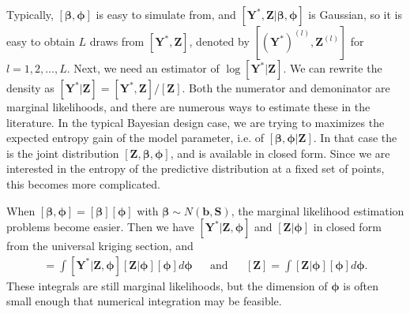 \documentclass[12pt]{article}
\begin{document}
Typically, $[\bm{\beta},\bm{\phi}]$ is easy to simulate from, and $[\bm{Y}^*,\bm{Z}|\bm{\beta},\bm{\phi}]$ is Gaussian, so it is easy to obtain $L$ draws from $[\bm{Y}^*,\bm{Z}]$, denoted by $[(\bm{Y}^*)^{(l)}, \bm{Z}^{(l)}]$ for $l=1,2,\dots,L$. Next, we need an estimator of $\log[\bm{Y}^*|\bm{Z}]$. We can rewrite the density as $[\bm{Y}^*|\bm{Z}] = [\bm{Y}^*,\bm{Z}]/[\bm{Z}]$. Both the numerator and demoninator are marginal likelihoods, and there are numerous ways to estimate these in the literature. In the typical Bayesian design case, we are trying to maximizes the expected entropy gain of the model parameter, i.e. of $[\bm{\beta},\bm{\phi}|\bm{Z}]$. In that case the is the joint distribution $[\bm{Z},\bm{\beta},\bm{\phi}]$, and is available in closed form. Since we are interested in the entropy of the predictive distribution at a fixed set of points, this becomes more complicated.

When $[\bm{\beta},\bm{\phi}]=[\bm{\beta}][\bm{\phi}]$ with $\bm{\beta}\sim N(\bm{b},\bm{S})$, the marginal likelihood estimation problems become easier. Then we have $[\bm{Y}^*|\bm{Z},\bm{\phi}]$ and $[\bm{Z}|\bm{\phi}]$ in closed form from the universal kriging section, and  
\begin{align*}
[\bm{Y}^*,\bm{Z}] = \int[\bm{Y}^*|\bm{Z},\bm{\phi}][\bm{Z}|\bm{\phi}][\bm{\phi}]d\bm{\phi} &&\mbox{and}&&[\bm{Z}] = \int[\bm{Z}|\bm{\phi}][\bm{\phi}]d\bm{\phi}.
\end{align*}
These integrals are still marginal likelihoods, but the dimension of $\bm{\phi}$ is often small enough that numerical integration may be feasible.


\clearpage\pagebreak\newpage\thispagestyle{empty}
%
\end{document}

